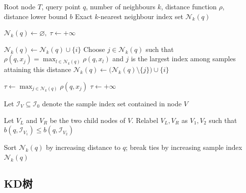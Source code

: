 \begin{algorithm}[H]
	\caption{Exact $k$-Nearest Neighbour Search by Lower-Bound Pruning}
	\label{alg:ExactKNNTreeSearch}
	\begin{algorithmic}[1]
		\Require Root node $T$, query point $q$, number of neighbours $k$, distance function $\rho$, distance lower bound $b$
		\Ensure Exact $k$-nearest neighbour index set $\mathcal{N}_k(q)$
		
		\State $\mathcal{N}_k(q)\gets\varnothing,\;\tau\gets+\infty$
		
		\State $\mathcal{N}_k(q)\gets\mathcal{N}_k(q)\cup\{i\}$
		\Else
		\State Choose $j\in\mathcal{N}_k(q)$ such that $\rho(q,x_j)=\displaystyle\max_{l\in\mathcal{N}_k(q)}\rho(q,x_l)$ and $j$ is the largest index among samples attaining this distance
		\State $\mathcal{N}_k(q)\gets
		\bigl(\mathcal{N}_k(q)\setminus\{j\}\bigr)\cup\{i\}$
		\EndIf
		\EndIf
		
		\State $\tau\gets
		\displaystyle\max_{j\in\mathcal{N}_k(q)}\rho(q,x_j)$
		\Else
		\State $\tau\gets+\infty$
		\EndIf
		\EndFunction
		
		\State Let $\mathcal{I}_V\subseteq\mathcal{I}_0$ denote the sample index set contained in node $V$
		\State \Return
		\EndIf
		
		\State {}
		\EndFor
		\State \Return
		\EndIf
		
		\State Let $V_L$ and $V_R$ be the two child nodes of $V$. Relabel $V_L,V_R$ as $V_1,V_2$ such that $b(q,\mathcal{I}_{V_1})\leqslant b(q,\mathcal{I}_{V_2})$
		
		\State {}
		
		\State {}
		\EndIf
		\EndFunction
		
		\State {}
		\State Sort $\mathcal{N}_k(q)$ by increasing distance to $q$; break ties by increasing sample index
		\State \Return $\mathcal{N}_k(q)$
	\end{algorithmic}
\end{algorithm}

\subsection{KD树}
